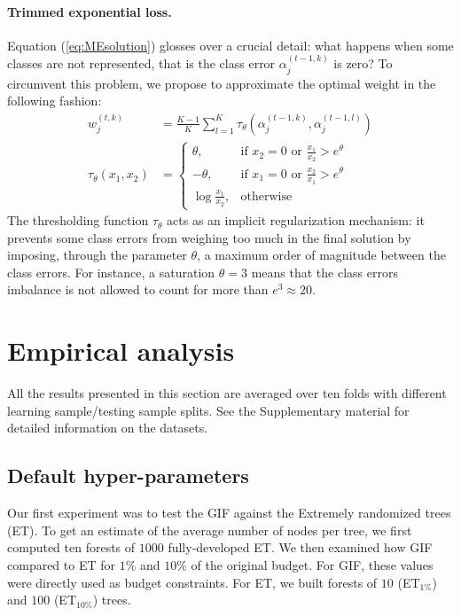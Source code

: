 \documentclass{article}
\begin{document}
\paragraph{Trimmed exponential loss.}
Equation (\ref{eq:MEsolution}) glosses over a crucial detail: what happens when 
some classes are not represented, that is the class error $\alpha_j^{(t-1, k)}$ 
is zero? To circumvent this problem, we propose to approximate the optimal 
weight in the following fashion:
\begin{align}\label{eq:METrimmed}
w_j^{(t,k)} &= \frac{K-1}{K} \sum_{l=1}^{K} \tau_{\theta} \left(\alpha_j^{(t-1, 
k)},  \alpha_j^{(t-1, l)}\right)\\
\tau_{\theta}(x_1, x_2) &=\begin{cases}
    \theta, & \text{if $x_2 = 0$ or $\frac{x_1}{x_2} > e^{\theta}$}\\
    -\theta,& \text{if $x_1 = 0$ or $\frac{x_2}{x_1} > e^{\theta}$}\\
    \log \frac{x_1}{x_2}, & \text{otherwise}
  \end{cases}
\end{align}
The thresholding function $\tau_{\theta}$ acts as an implicit regularization 
mechanism: it prevents some class errors from weighing too much in the final 
solution by imposing, through the parameter $\theta$, a maximum order of magnitude between the class errors. %
For instance, a saturation $\theta=3$ means that the class errors imbalance is 
not allowed to count for more than $e^3 \approx 20$. 




\section{Empirical analysis}
\label{sec:analysis}

All the results presented in this section are averaged over ten folds
with different learning sample/testing sample splits. See the Supplementary 
material for detailed information on the datasets.

\subsection{Default hyper-parameters}
\label{subsec:defaultHP}

Our first experiment was to test the GIF against the Extremely randomized trees 
(ET).
To get an estimate of the average number of nodes per tree, we first 
computed ten forests of $1000$ fully-developed ET. We then examined how GIF 
compared to ET for $1\%$ and $10\%$ of the original budget. For GIF, these 
values were directly used as budget constraints. For ET, we built forests of 
$10$ (ET$_{1\%}$) and $100$ (ET$_{10\%}$) trees. 
\end{document}
